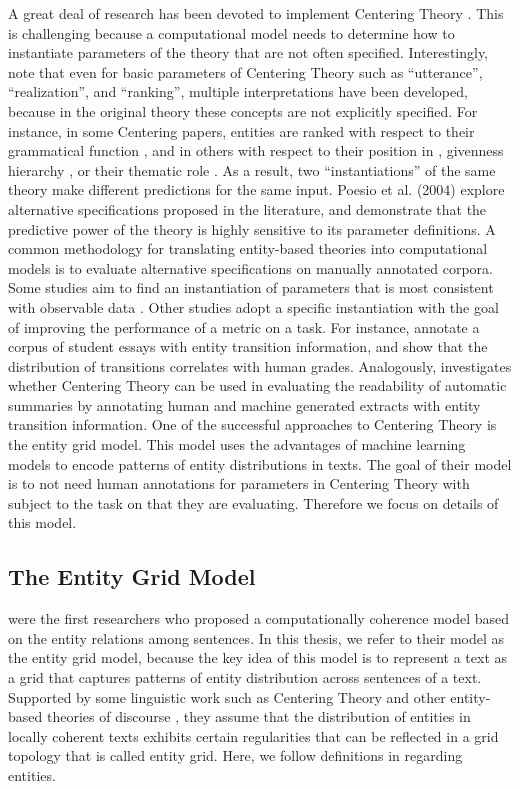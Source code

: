 A great deal of research has been devoted to implement Centering Theory \cite{miltsakaki00,karamanis04a}. 
This is challenging because a computational model needs to determine how to instantiate parameters of the theory that are not often specified. 
Interestingly,  note that even for basic parameters of Centering Theory such as ``utterance'', ``realization'', and ``ranking'', multiple interpretations have been developed, because in the original theory these concepts are not explicitly specified. 
For instance, in some Centering papers, entities are ranked with respect to their grammatical function \cite{brennan87,grosz95}, and in others with respect to their position in , givenness hierarchy \cite{strube99}, or their thematic role \cite{sidner04}.
As a result, two “instantiations” of the same theory make different predictions for the same input. 
Poesio et al. (2004) explore alternative specifications proposed in the literature, and demonstrate that the predictive power of the theory is highly sensitive to its parameter definitions.
A common methodology for translating entity-based theories into computational models is to evaluate alternative specifications on manually annotated corpora. 
Some studies aim to find an instantiation of parameters that is most consistent with observable data \cite{strube99,karamanis04,poesio04}.  Other studies adopt a specific instantiation with the goal of improving the performance of a metric on a task. 
For instance,  annotate a corpus of student essays with entity transition information, and show that the distribution of transitions correlates with human grades. 
Analogously,  investigates whether Centering Theory can be used in evaluating the readability of automatic summaries by annotating human and machine generated extracts with entity transition information.
One of the successful approaches to Centering Theory is the entity grid model. 
This model uses the advantages of machine learning models to encode patterns of entity distributions in texts.
The goal of their model is to not need human annotations for parameters in Centering Theory with subject to the task on that they are evaluating. 
Therefore we focus on details of this model. 

\subsection{The Entity Grid Model}
\label{sec:rel-ent-grid} 

 were the first researchers who proposed a computationally coherence model based on the entity relations among sentences. 
In this thesis, we refer to their model as the entity grid model, because the key idea of this model is to represent a text as a grid that captures patterns of entity distribution across sentences of a text.  
Supported by some linguistic work such as Centering Theory \cite{grosz95} and other entity-based theories of discourse \cite{givon87,prince81a}, they assume that the distribution of entities in locally coherent texts exhibits certain regularities that can be reflected in a grid topology that is called entity grid.
Here, we follow definitions in  regarding entities.  

